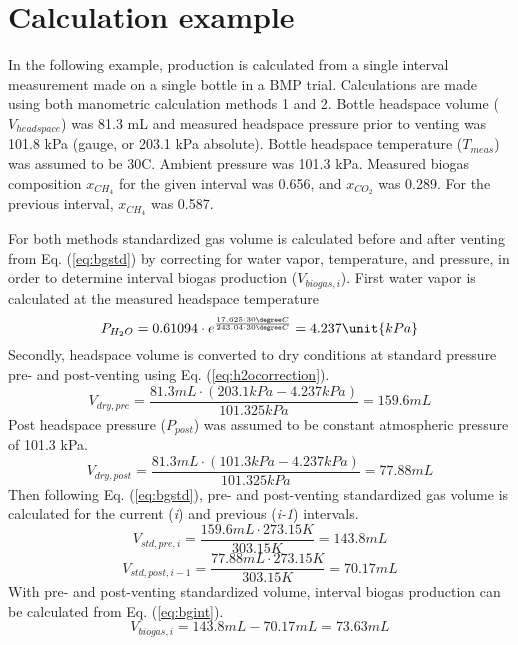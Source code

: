 
\section{Calculation example}
In the following example,  production is calculated from a single interval measurement made on a single bottle in a BMP trial. 
Calculations are made using both manometric calculation methods 1 and 2. 
Bottle headspace volume ($V_{headspace}$) was 81.3 mL and measured headspace pressure prior to venting was 101.8 kPa (gauge, or 203.1 kPa absolute). 
Bottle headspace temperature ($T_{meas}$) was assumed to be 30\degree C.
Ambient pressure was 101.3 kPa.
Measured biogas composition $x_{CH_4}$ for the given interval was 0.656, and $x_{CO_2}$ was 0.289.
For the previous interval, $x_{CH_4}$ was 0.587.

For both methods standardized gas volume is calculated before and after venting from Eq. (\ref{eq:bgstd}) by correcting for water vapor, temperature, and pressure, in order to determine interval biogas production ($V_{biogas,i}$). 
First water vapor is calculated at the measured headspace temperature
\begin{equation*}
    P_{H_{2}O} = 0.61094 \cdot e^\frac{17.625 \cdot 30\degree C}{243.04 \cdot 30\degree C} = 4.237\unit{kPa}
\end{equation*}
Secondly, headspace volume is converted to dry conditions at standard pressure pre- and post-venting using Eq. (\ref{eq:h2ocorrection}). 
\begin{equation*}
  V_{dry,pre} = \frac{81.3\unit{mL} \cdot (203.1\unit{kPa} - 4.237\unit{kPa})}{101.325\unit{kPa}} = 159.6\unit{mL}
\end{equation*}
Post headspace pressure ($P_{post}$) was assumed to be constant atmospheric pressure of 101.3 kPa. 
\begin{equation*}
    V_{dry,post} = \frac{81.3\unit{mL} \cdot (101.3\unit{kPa} - 4.237\unit{kPa})}{101.325\unit{kPa}} = 77.88\unit{mL}
\end{equation*}
Then following Eq. (\ref{eq:bgstd}), pre- and post-venting standardized gas volume is calculated for the current (\textit{i}) and previous (\textit{i-1}) intervals. 
\begin{equation*}
    V_{std,pre,i} = \frac{159.6\unit{mL} \cdot 273.15\unit{K}}{303.15\unit{K}} = 143.8\unit{mL}
\end{equation*}
\begin{equation*}
    V_{std,post,i-1} = \frac{77.88\unit{mL} \cdot 273.15\unit{K}}{303.15\unit{K}} = 70.17\unit{mL}
\end{equation*}
With pre- and post-venting standardized volume, interval biogas production can be calculated from Eq. (\ref{eq:bgint}).
\begin{equation*}
    V_{biogas,i} = 143.8\unit{mL} - 70.17\unit{mL} = 73.63\unit{mL}
\end{equation*}
